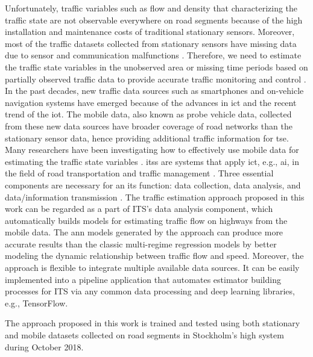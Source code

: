 \documentclass[english]{kththesis}
\begin{document}
Unfortunately, traffic variables such as flow and density that characterizing the traffic state are not observable everywhere on road segments because of the high installation and maintenance costs of traditional stationary sensors. Moreover, most of the traffic datasets collected from stationary sensors have missing data due to sensor and communication malfunctions \cite{duan_dl_imputation}. Therefore, we need to estimate the traffic state variables in the unobserved area or missing time periods based on partially observed traffic data to provide accurate traffic monitoring and control \cite{seo_tse}. In the past decades, new traffic data sources such as smartphones and on-vehicle navigation systems have emerged because of the advances in \gls{ict} and the recent trend of the \gls{iot}. The mobile data, also known as probe vehicle data, collected from these new data sources have broader coverage of road networks than the stationary sensor data, hence providing additional traffic information for \gls{tse}. Many researchers have been investigating how to effectively use mobile data for estimating the traffic state variables \cite{anuar_flow_probe, neumann_bayesian, blandin_individual_speed, Bulteau_flow_higher-order}. \glspl{its} are systems that apply \gls{ict}, e.g., \gls{ai}, in the field of road transportation and traffic management \cite{eu_ITS, sumalee_future_ITS}.  Three essential components are necessary for an \gls{its} function: data collection, data analysis, and data/information transmission \cite{sumalee_future_ITS}. The traffic estimation approach proposed in this work can be regarded as a part of ITS's data analysis component, which automatically builds models for estimating traffic flow on highways from the mobile data. The \gls{ann} models generated by the approach can produce more accurate results than the classic multi-regime regression models by better modeling the dynamic relationship between traffic flow and speed. Moreover, the approach is flexible to integrate multiple available data sources. It can be easily implemented into a pipeline application that automates estimator building processes for ITS via any common data processing and deep learning libraries, e.g., TensorFlow.

The approach proposed in this work is trained and tested using both stationary and mobile datasets collected on road segments in Stockholm's high system during October 2018.\\
\end{document}
